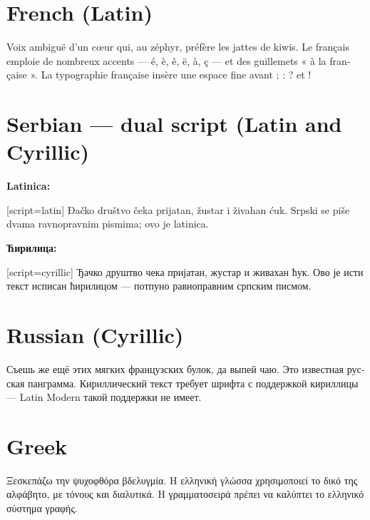\documentclass[11pt,a4paper]{article}
\begin{document}
\section*{French (Latin)}
\begin{french}
Voix ambiguë d'un cœur qui, au zéphyr, préfère les jattes de kiwis. Le français
emploie de nombreux accents — é, è, ê, ë, à, ç — et des guillemets « à la
française ». La typographie française insère une espace fine avant ; : ? et !
\end{french}

\section*{Serbian — dual script (Latin and Cyrillic)}
\textbf{Latinica:}
\begin{serbian}[script=latin]
Đačko društvo čeka prijatan, žustar i živahan ćuk. Srpski se piše dvama
ravnopravnim pismima; ovo je latinica.
\end{serbian}

\smallskip\noindent\textbf{Ћирилица:}
\begin{serbian}[script=cyrillic]
Ђачко друштво чека пријатан, жустар и живахан ћук. Ово је исти текст исписан
ћирилицом — потпуно равноправним српским писмом.
\end{serbian}

\section*{Russian (Cyrillic)}
\begin{russian}
Съешь же ещё этих мягких французских булок, да выпей чаю. Это известная
русская панграмма. Кириллический текст требует шрифта с поддержкой кириллицы —
Latin Modern такой поддержки не имеет.
\end{russian}

\section*{Greek}
\begin{greek}
Ξεσκεπάζω την ψυχοφθόρα βδελυγμία. Η ελληνική γλώσσα χρησιμοποιεί το δικό της
αλφάβητο, με τόνους και διαλυτικά. Η γραμματοσειρά πρέπει να καλύπτει το
ελληνικό σύστημα γραφής.
\end{greek}
\end{document}
